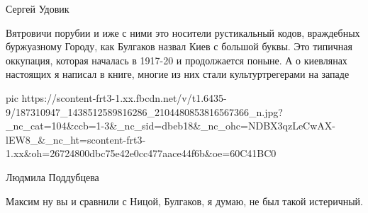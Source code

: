 Сергей Удовик

Вятровичи порубии и иже с ними это носители рустикальный кодов, враждебных
буржуазному Городу, как Булгаков назвал Киев с большой буквы. Это типичная
оккупация, которая началась в 1917-20 и продолжается поныне. А о киевлянах
настоящих я написал в книге, многие из них стали культуртрегерами на западе

\ifcmt
  pic https://scontent-frt3-1.xx.fbcdn.net/v/t1.6435-9/187310947_1438512589816286_2104480853816567366_n.jpg?_nc_cat=104&ccb=1-3&_nc_sid=dbeb18&_nc_ohc=NDBX3qzLeCwAX-lEW8_&_nc_ht=scontent-frt3-1.xx&oh=26724800dbc75e42e0cc477aace44f6b&oe=60C41BC0
\fi

Людмила Поддубцева

Максим ну вы и сравнили с Ницой, Булгаков, я думаю, не был такой истеричный.
